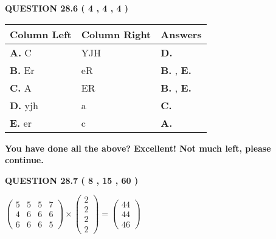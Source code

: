 \documentclass[12pt]{article}
\begin{document}
 
 
  
\vspace{0.2in}
  
{\textbf{\Large{QUESTION
28.6 
 (           4 ,           4 ,           4 )
}}}
  
  
 
 
\noindent{}
  
  
\begin{tabular}{|l|l|l|}
 \hline
 Column Left & Column Right  & Answers       \\ 
 \hline
{\textbf{\large{
A.}}}
C
  & 
YJH
 & 
{\textbf{\large{
D.}}}
 \\ 
 \hline
{\textbf{\large{
B.}}}
Er
  & 
eR
 & 
{\textbf{\large{
B.}}}
, 
{\textbf{\large{
E.}}}
 \\ 
 \hline
{\textbf{\large{
C.}}}
A
  & 
ER
 & 
{\textbf{\large{
B.}}}
, 
{\textbf{\large{
E.}}}
 \\ 
 \hline
{\textbf{\large{
D.}}}
yjh
  & 
a
 & 
{\textbf{\large{
C.}}}
 \\ 
 \hline
{\textbf{\large{
E.}}}
er
  & 
c
 & 
{\textbf{\large{
A.}}}
 \\ 
 \hline
 \end{tabular}
  
  
 
 
 
 
   
   
\vspace{0.3in}
{\textbf{\LARGE{You have done all the above? Excellent! Not much left, please continue.}}}
\vspace{0.3in}
   
   
  
\vspace{0.2in}
  
{\textbf{\Large{QUESTION
28.7 
 (           8 ,          15 ,          60 )
}}}
  
  
 
 
\noindent{}

 
$\left( \begin{array}{ccccccccccccccc}
           5  & 
           5  & 
           5  & 
           7  \\ 
           4  & 
           6  & 
           6  & 
           6  \\ 
           6  & 
           6  & 
           6  & 
           5
\end{array}\right) \times
\left( \begin{array}{c}
           2  \\ 
           2  \\ 
           2  \\ 
           2
\end{array}\right)  =
\left( \begin{array}{c}
          44  \\ 
          44  \\ 
          46
\end{array}\right)  $
 
\end{document}

